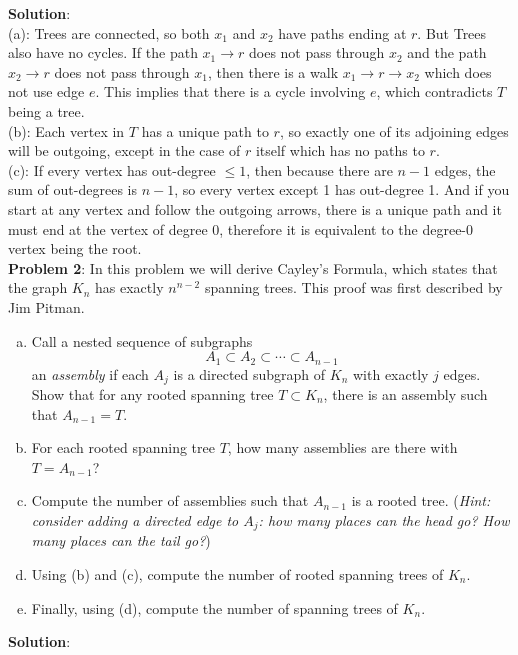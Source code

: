 \documentclass{amsart}
\begin{document}
	\textbf{Solution}: \\
	
	(a): Trees are connected, so both $x_1$ and $x_2$ have paths ending at $r$. But Trees also have no cycles. If the path $x_1\to r$ does not pass through $x_2$ and the path $x_2\to r$ does not pass through $x_1$, then there is a walk $x_1\to r \to x_2$ which does not use edge $e$. This implies that there is a cycle involving $e$, which contradicts $T$ being a tree.\\
	
	(b): Each vertex in $T$ has a unique path to $r$, so exactly one of its adjoining edges will be outgoing, except in the case of $r$ itself which has no paths to $r$.\\
	
	(c): If every vertex has out-degree $\leq 1$, then because there are $n-1$ edges, the sum of out-degrees is $n-1$, so every vertex except 1 has out-degree 1. And if you start at any vertex and follow the outgoing arrows, there is a unique path and it must end at the vertex of degree 0, therefore it is equivalent to the degree-0 vertex being the root.\\
	
	\noindent \textbf{Problem 2}: In this problem we will derive Cayley's Formula, which states that the graph $K_n$ has exactly $n^{n-2}$ spanning trees. This proof was first described by Jim Pitman.
	\begin{enumerate}[(a)]
		\item Call a nested sequence of subgraphs 
		$$A_1\subset A_2\subset \cdots \subset A_{n-1}$$
		an \textit{assembly} if each $A_j$ is a directed subgraph of $K_n$ with exactly $j$ edges. Show that for any rooted spanning tree $T\subset K_n$, there is an assembly such that $A_{n-1}=T$.
		\item For each rooted spanning tree $T$, how many assemblies are there with $T=A_{n-1}$?
		\item Compute the number of assemblies such that $A_{n-1}$ is a rooted tree. (\textit{Hint: consider adding a directed edge to $A_j$: how many places can the head go? How many places can the tail go?})
		\item Using (b) and (c), compute the number of rooted spanning trees of $K_n$.
		\item Finally, using (d), compute the number of spanning trees of $K_n$.\\
	\end{enumerate}
	
	\textbf{Solution}: \\
	
\end{document}
